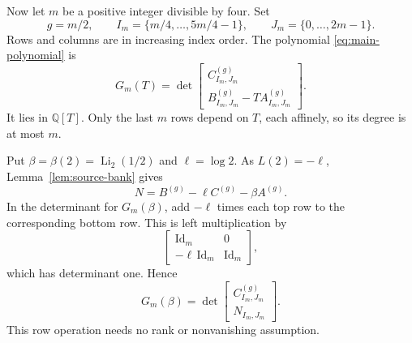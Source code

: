 Now let $m$ be a positive integer divisible by four. Set
\[
g=m/2,\qquad
I_m=\{m/4,\ldots,5m/4-1\},\qquad
J_m=\{0,\ldots,2m-1\}.
\]
Rows and columns are in increasing index order. The polynomial
\eqref{eq:main-polynomial} is
\[
G_m(T)=
\det\begin{bmatrix}
C^{(g)}_{I_m,J_m}\\
B^{(g)}_{I_m,J_m}-T A^{(g)}_{I_m,J_m}
\end{bmatrix}.
\]
It lies in $\mathbb Q[T]$. Only the last $m$ rows depend on $T$, each
affinely, so its degree is at most $m$.

Put $\beta=\beta(2)=\operatorname{Li}_2(1/2)$ and $\ell=\log2$.
As $L(2)=-\ell$, Lemma~\ref{lem:source-bank} gives
\[
N=B^{(g)}-\ell C^{(g)}-\beta A^{(g)}.
\]
In the determinant for $G_m(\beta)$, add $-\ell$ times each top row to the
corresponding bottom row. This is left multiplication by
\[
\begin{bmatrix}
\mathrm{Id}_m&0\\
-\ell\,\mathrm{Id}_m&\mathrm{Id}_m
\end{bmatrix},
\]
which has determinant one. Hence
\begin{equation}\label{eq:source-determinant}
G_m(\beta)=
\det\begin{bmatrix}
C^{(g)}_{I_m,J_m}\\
N_{I_m,J_m}
\end{bmatrix}.
\end{equation}
This row operation needs no rank or nonvanishing assumption.
